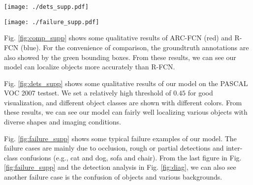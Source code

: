\documentclass[10pt,twocolumn,letterpaper]{article}
\begin{document}
\begin{appendix}
\begin{figure*}
\centering
{\texttt{[image: ./dets\_supp.pdf]}}
\caption{Qualitative Results of ARC-FCN-Res101 on Pascal VOC 2007 test set. For good displaying, different object classes are shown with different colors. The score threshold is set to $0.45$ for good visualization. Best viewed in color and zoom in. }
\label{fig:dets_supp}
\end{figure*} 

\begin{figure*}
\centering
{\texttt{[image: ./failure\_supp.pdf]}}
\caption{Failure examples of ARC-FCN-Res101 on Pascal VOC 2007 test set. 
Different object classes are shown with different colors.
The score threshold is set to $0.45$ for good visualization.
The failure cases are mainly due to occlusion, rough or partial detections, and inter-class or foreground/background confusions.
Best viewed in color and zoom in. }
\label{fig:failure_supp}
\end{figure*}

Fig. \ref{fig:comp_supp} shows some qualitative results of ARC-FCN (red) and R-FCN (blue). For the convenience of comparison, the groundtruth annotations are also showed by the green bounding boxes. From these results, we can see our model can localize objects more accurately than R-FCN.

Fig. \ref{fig:dets_supp} shows some qualitative results of our model on the PASCAL VOC 2007 testset. 
We set a relatively high threshold of $0.45$ for good visualization, and different object classes are shown with different colors. From these results, we can see our model can fairly well localizing various objects with diverse shapes and imaging conditions.


 
Fig. \ref{fig:failure_supp} shows some typical failure examples of our model. The failure cases are mainly due to occlusion, rough or partial detections and inter-class confusions (e.g., cat and dog, sofa and chair).
From the last figure in Fig. \ref{fig:failure_supp} and the detection analysis in Fig. \ref{fig:diag}, we can also see another failure case is the confusion of objects and various backgrounds.
\end{appendix}


{\small


}
\end{document}
